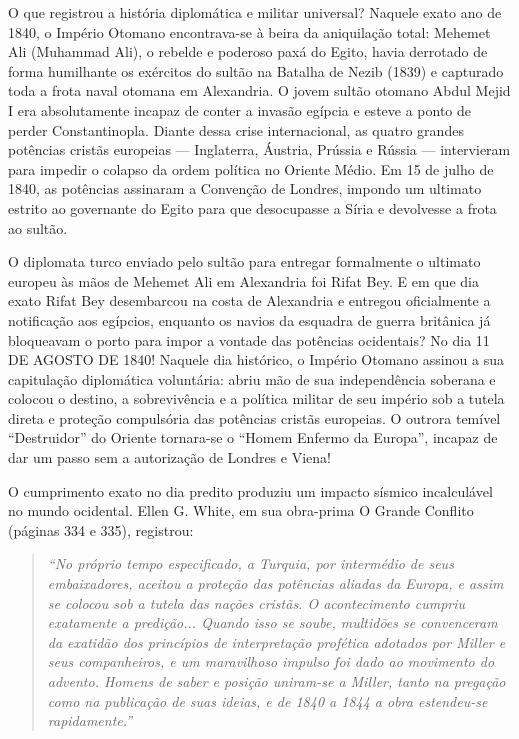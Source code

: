 O que registrou a história diplomática e militar universal?
Naquele exato ano de 1840, o Império Otomano encontrava-se à beira da aniquilação total: Mehemet Ali (Muhammad Ali), o rebelde e poderoso paxá do Egito, havia derrotado de forma humilhante os exércitos do sultão na Batalha de Nezib (1839) e capturado toda a frota naval otomana em Alexandria. O jovem sultão otomano Abdul Mejid I era absolutamente incapaz de conter a invasão egípcia e esteve a ponto de perder Constantinopla.
Diante dessa crise internacional, as quatro grandes potências cristãs europeias — Inglaterra, Áustria, Prússia e Rússia — intervieram para impedir o colapso da ordem política no Oriente Médio. Em 15 de julho de 1840, as potências assinaram a Convenção de Londres, impondo um ultimato estrito ao governante do Egito para que desocupasse a Síria e devolvesse a frota ao sultão.

O diplomata turco enviado pelo sultão para entregar formalmente o ultimato europeu às mãos de Mehemet Ali em Alexandria foi Rifat Bey. E em que dia exato Rifat Bey desembarcou na costa de Alexandria e entregou oficialmente a notificação aos egípcios, enquanto os navios da esquadra de guerra britânica já bloqueavam o porto para impor a vontade das potências ocidentais?
No dia 11 DE AGOSTO DE 1840!
Naquele dia histórico, o Império Otomano assinou a sua capitulação diplomática voluntária: abriu mão de sua independência soberana e colocou o destino, a sobrevivência e a política militar de seu império sob a tutela direta e proteção compulsória das potências cristãs europeias. O outrora temível ``Destruidor'' do Oriente tornara-se o ``Homem Enfermo da Europa'', incapaz de dar um passo sem a autorização de Londres e Viena!

O cumprimento exato no dia predito produziu um impacto sísmico incalculável no mundo ocidental. Ellen G. White, em sua obra-prima O Grande Conflito (páginas 334 e 335), registrou:

\begin{quote}
\itshape ``No próprio tempo especificado, a Turquia, por intermédio de seus embaixadores, aceitou a proteção das potências aliadas da Europa, e assim se colocou sob a tutela das nações cristãs. O acontecimento cumpriu exatamente a predição... Quando isso se soube, multidões se convenceram da exatidão dos princípios de interpretação profética adotados por Miller e seus companheiros, e um maravilhoso impulso foi dado ao movimento do advento. Homens de saber e posição uniram-se a Miller, tanto na pregação como na publicação de suas ideias, e de 1840 a 1844 a obra estendeu-se rapidamente.''
\end{quote}



